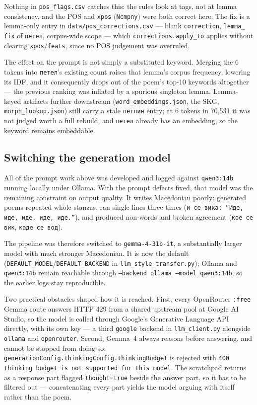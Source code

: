 \documentclass[11pt]{article}
\begin{document}
Nothing in \texttt{pos\_flags.csv} catches this: the rules look at tags, not at
lemma consistency, and the POS and \texttt{xpos} (\texttt{Ncmpny}) were both
correct here. The fix is a lemma-only entry in
\texttt{data/pos\_corrections.csv} — blank \texttt{correction}, \texttt{lemma\_
fix} of \texttt{петел}, corpus-wide scope — which \texttt{corrections.apply\_to}
applies without clearing \texttt{xpos}/\texttt{feats}, since no POS judgement
was overruled.

The effect on the prompt is not simply a substituted keyword. Merging the 6
tokens into \texttt{петел}'s existing count raises that lemma's corpus
frequency, lowering its IDF, and it consequently drops out of the poem's top-10
keywords altogether — the previous ranking was inflated by a spurious singleton
lemma. Lemma-keyed artifacts further downstream (\texttt{word\_embeddings.json},
the SKG, \texttt{morph\_lookup.json}) still carry a stale \texttt{петлин} entry;
at 6 tokens in 70{,}531 it was not judged worth a full rebuild, and
\texttt{петел} already has an embedding, so the keyword remains embeddable.

\subsection{Switching the generation model}\label{sec:gemmaswitch}

All of the prompt work above was developed and logged against
\texttt{qwen3:14b} running locally under Ollama. With the prompt defects fixed,
that model was the remaining constraint on output quality. It writes
Macedonian poorly: generated poems repeated whole stanzas, ran single lines
three times (\texttt{и се вика: ``Иде, иде, иде, иде, иде.''}), and produced
non-words and broken agreement (\texttt{кое се вик}, \texttt{каде се вод}).

The pipeline was therefore switched to \texttt{gemma-4-31b-it}, a
substantially larger model with much stronger Macedonian. It is now the
default (\texttt{DEFAULT\_MODEL}/\texttt{DEFAULT\_BACKEND} in
\texttt{llm\_style\_transfer.py}); Ollama and \texttt{qwen3:14b} remain
reachable through \texttt{--backend ollama --model qwen3:14b}, so the earlier
logs stay reproducible.

Two practical obstacles shaped how it is reached. First, every OpenRouter
\texttt{:free} Gemma route answers HTTP 429 from a shared upstream pool at
Google AI Studio, so the model is called through Google's Generative Language
API directly, with its own key — a third \texttt{google} backend in
\texttt{llm\_client.py} alongside \texttt{ollama} and \texttt{openrouter}.
Second, Gemma~4 always reasons before answering, and cannot be stopped from
doing so: \texttt{generationConfig.thinkingConfig.thinkingBudget} is rejected
with \texttt{400 Thinking budget is not supported for this model}. The
scratchpad returns as a response part flagged \texttt{thought=true} beside the
answer part, so it has to be filtered out — concatenating every part yields the
model arguing with itself rather than the poem.
\end{document}
